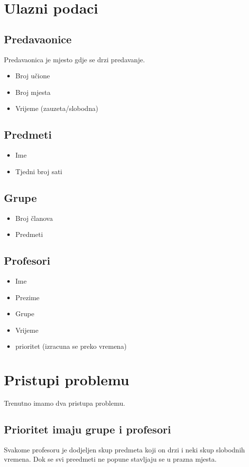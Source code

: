 \section{Ulazni podaci}
  \subsection{Predavaonice}
  Predavaonica je mjesto gdje se drzi predavanje.
    \begin{itemize}
      \item Broj učione
      \item Broj mjesta
      \item Vrijeme (zauzeta/slobodna)
    \end{itemize}
  \subsection{Predmeti}
    \begin{itemize}
      \item Ime
      \item Tjedni broj sati
    \end{itemize}
  \subsection{Grupe}
    \begin{itemize}
      \item Broj članova
      \item Predmeti
    \end{itemize}
  \subsection{Profesori}
    \begin{itemize}
      \item Ime
      \item Prezime
      \item Grupe
      \item Vrijeme
      \item prioritet (izracuna se preko vremena)
    \end{itemize}

\section{Pristupi problemu}
    Trenutno imamo dva pristupa problemu.
    \subsection{Prioritet imaju grupe i profesori}
    Svakome profesoru je dodjeljen skup predmeta koji on drzi i neki skup slobodnih vremena. Dok se svi preedmeti ne popune stavljaju se u prazna mjesta.
